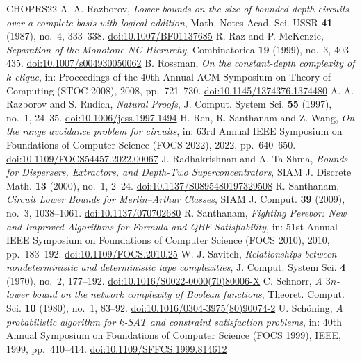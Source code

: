 \documentclass[11pt,reqno]{amsart}
\numberwithin{equation}{section}
\theoremstyle{plain}
\theoremstyle{definition}
\theoremstyle{remark}
\begin{document}
\begin{thebibliography}{CHOPRS22}
 A. A. Razborov, \emph{Lower bounds on the size of bounded depth circuits over a complete basis with logical addition}, Math. Notes Acad. Sci. USSR \textbf{41} (1987), no.~4, 333--338. \href{https://doi.org/10.1007/BF01137685}{doi:10.1007/BF01137685}
 R. Raz and P. McKenzie, \emph{Separation of the Monotone NC Hierarchy}, Combinatorica \textbf{19} (1999), no.~3, 403--435. \href{https://doi.org/10.1007/s004930050062}{doi:10.1007/s004930050062}
 B. Rossman, \emph{On the constant-depth complexity of $k$-clique}, in: Proceedings of the 40th Annual ACM Symposium on Theory of Computing (STOC 2008), 2008, pp.~721--730. \href{https://doi.org/10.1145/1374376.1374480}{doi:10.1145/1374376.1374480}
 A. A. Razborov and S. Rudich, \emph{Natural Proofs}, J. Comput. System Sci. \textbf{55} (1997), no.~1, 24--35. \href{https://doi.org/10.1006/jcss.1997.1494}{doi:10.1006/jcss.1997.1494}
 H. Ren, R. Santhanam and Z. Wang, \emph{On the range avoidance problem for circuits}, in: 63rd Annual IEEE Symposium on Foundations of Computer Science (FOCS 2022), 2022, pp.~640--650. \href{https://doi.org/10.1109/FOCS54457.2022.00067}{doi:10.1109/FOCS54457.2022.00067}
 J. Radhakrishnan and A. Ta-Shma, \emph{Bounds for Dispersers, Extractors, and Depth-Two Superconcentrators}, SIAM J. Discrete Math. \textbf{13} (2000), no.~1, 2--24. \href{https://doi.org/10.1137/S0895480197329508}{doi:10.1137/S0895480197329508}
 R. Santhanam, \emph{Circuit Lower Bounds for Merlin--Arthur Classes}, SIAM J. Comput. \textbf{39} (2009), no.~3, 1038--1061. \href{https://doi.org/10.1137/070702680}{doi:10.1137/070702680}
 R. Santhanam, \emph{Fighting Perebor: New and Improved Algorithms for Formula and QBF Satisfiability}, in: 51st Annual IEEE Symposium on Foundations of Computer Science (FOCS 2010), 2010, pp.~183--192. \href{https://doi.org/10.1109/FOCS.2010.25}{doi:10.1109/FOCS.2010.25}
 W. J. Savitch, \emph{Relationships between nondeterministic and deterministic tape complexities}, J. Comput. System Sci. \textbf{4} (1970), no.~2, 177--192. \href{https://doi.org/10.1016/S0022-0000(70)80006-X}{doi:10.1016/S0022-0000(70)80006-X}
 C. Schnorr, \emph{A $3n$-lower bound on the network complexity of Boolean functions}, Theoret. Comput. Sci. \textbf{10} (1980), no.~1, 83--92. \href{https://doi.org/10.1016/0304-3975(80)90074-2}{doi:10.1016/0304-3975(80)90074-2}
 U. Sch{\"o}ning, \emph{A probabilistic algorithm for $k$-SAT and constraint satisfaction problems}, in: 40th Annual Symposium on Foundations of Computer Science (FOCS 1999), IEEE, 1999, pp.~410--414. \href{https://doi.org/10.1109/SFFCS.1999.814612}{doi:10.1109/SFFCS.1999.814612}

\end{thebibliography}
\end{document}
